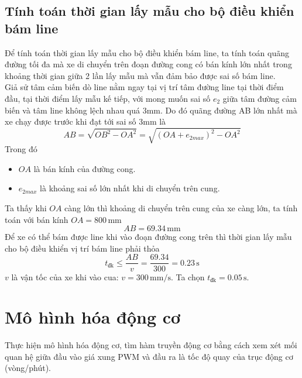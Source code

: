           \subsection{Tính toán thời gian lấy mẫu cho bộ điều khiển bám line}
               \hspace*{0.6cm}Để tính toán thời gian lấy mẫu cho bộ điều khiển bám line, ta tính toán quãng đường tối đa mà xe di chuyển trên đoạn đường cong 
               có bán kính lớn nhất trong khoảng thời gian giữa 2 lần lấy mẫu mà vẫn đảm bảo được sai số bám line.\\
               \hspace*{0.6cm}Giả sử tâm cảm biến dò line nằm ngay tại vị trí tâm đường line tại thời điểm đầu, tại thời điểm lấy mẫu kế tiếp, với mong muốn sai số $e_2$ giữa tâm đường cảm biến 
               và tâm line không lệch nhau quá 3mm. Do đó quãng đường AB lớn nhất mà xe chạy được trước khi đạt tới sai số 3mm là 
               \begin{equation*}
                    AB = \sqrt{OB^2 - OA^2} = \sqrt{(OA + e_{2max})^2 - OA^2}
               \end{equation*}
               Trong đó 
               \begin{itemize}
                    \item $OA$ là bán kính của đường cong.
                    \item $e_{2max}$ là khoảng sai số lớn nhất khi di chuyển trên cung.
               \end{itemize}
               Ta thấy khi $OA$ càng lớn thì khoảng di chuyển trên cung của xe càng lớn, ta tính toán với bán kính $OA = 800 \,\mathrm{mm}$
               \begin{equation*}
                    AB = 69.34 \,\mathrm{mm}
               \end{equation*}
               Để xe có thể bám được line khi vào đoạn đường cong trên thì thời gian lấy mẫu cho bộ điều khiển vị trí bám line phải thỏa
               \begin{equation*}
                    t_{\text{đk}} \leq \dfrac{AB}{v} = \dfrac{69.34}{300} = 0.23 \,\mathrm{s}
               \end{equation*}
               $v$ là vận tốc của xe khi vào cua: $v = 300 \,\mathrm{mm/s}$.
               Ta chọn $t_{\text{đk}} = 0.05 \,\mathrm{s}$.

     \section{Mô hình hóa động cơ}
          \hspace*{0.6cm}Thực hiện mô hình hóa động cơ, tìm hàm truyền động cơ bằng cách xem xét mối quan hệ giữa đầu vào giá xung PWM và đầu ra là tốc độ quay của trục động cơ (vòng/phút).   
